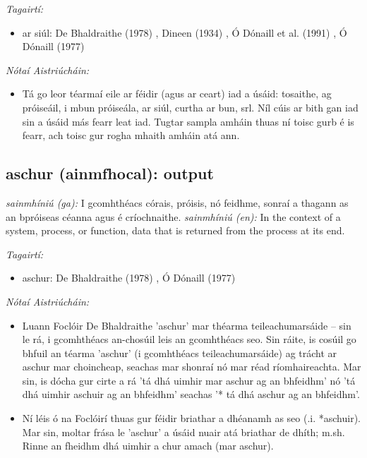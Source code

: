 \documentclass{article}
\begin{document}
 \noindent \textit{Tagairtí:}
\begin{itemize}
	\item ar siúl: De Bhaldraithe (1978) \cite{de-bhaldraithe}, Dineen (1934) \cite{dineen}, Ó Dónaill et al. (1991) \cite{focloir-beag}, Ó Dónaill (1977) \cite{odonaill}
\end{itemize}

 \noindent \textit{Nótaí Aistriúcháin:}
\begin{itemize}
	\item Tá go leor téarmaí eile ar féidir (agus ar ceart) iad a úsáid: tosaithe, ag próiseáil, i mbun próiseála, ar siúl, curtha ar bun, srl. Níl cúis ar bith gan iad sin a úsáid más fearr leat iad. Tugtar sampla amháin thuas ní toisc gurb é is fearr, ach toisc gur rogha mhaith amháin atá ann.
\end{itemize}


\subsection*{aschur (ainmfhocal): output} 
 \noindent \textit{sainmhíniú (ga):} I gcomhthéacs córais, próisis, nó feidhme, sonraí a thagann as an bpróiseas céanna agus é críochnaithe.
\newline\newline
 \noindent \textit{sainmhíniú (en):} In the context of a system, process, or function, data that is returned from the process at its end.
\newline

 \noindent \textit{Tagairtí:}
\begin{itemize}
	\item aschur: De Bhaldraithe (1978) \cite{de-bhaldraithe}, Ó Dónaill (1977) \cite{odonaill}
\end{itemize}

 \noindent \textit{Nótaí Aistriúcháin:}
\begin{itemize}
	\item Luann Foclóir De Bhaldraithe 'aschur' mar théarma teileachumarsáide -- sin le rá, i gcomhthéacs an-chosúil leis an gcomhthéacs seo. Sin ráite, is cosúil go bhfuil an téarma 'aschur' (i gcomhthéacs teileachumarsáide) ag trácht ar aschur mar choincheap, seachas mar shonraí nó mar réad ríomhaireachta. Mar sin, is dócha gur cirte a rá 'tá dhá uimhir mar aschur ag an bhfeidhm' nó 'tá dhá uimhir aschuir ag an bhfeidhm' seachas '* tá dhá aschur ag an bhfeidhm'.
	\item Ní léis ó na Foclóirí thuas gur féidir briathar a dhéanamh as seo (.i. *aschuir). Mar sin, moltar frása le 'aschur' a úsáid nuair atá briathar de dhíth; m.sh. Rinne an fheidhm dhá uimhir a chur amach (mar aschur).
\end{itemize}
\end{document}
